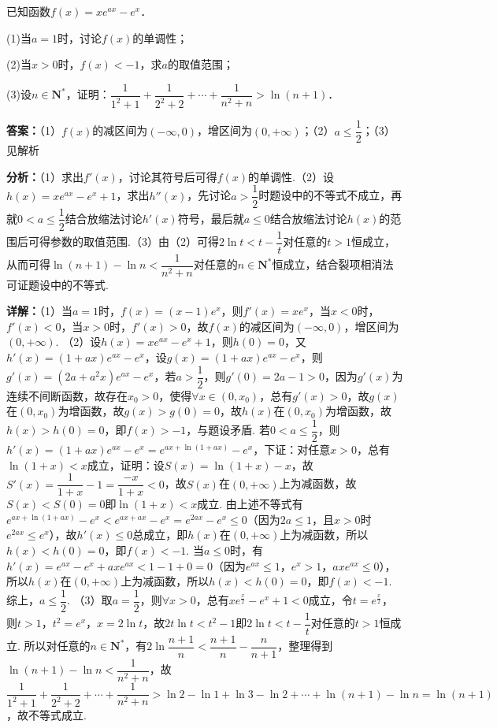 \begin{question}[points=12]
已知函数$f(x)=xe^{ax}-e^x$．

(1)当$a=1$时，讨论$f(x)$的单调性；

(2)当$x>0$时，$f(x)<-1$，求$a$的取值范围；

(3)设$n\in\mathbf{N}^*$，证明：$\dfrac{1}{1^2+1}+\dfrac{1}{2^2+2}+\cdots+\dfrac{1}{n^2+n}>\ln(n+1)$．
\begin{solution}
\textbf{答案：}（1）$f(x)$的减区间为$(-\infty,0)$，增区间为$(0,+\infty)$；（2）$a\leq\dfrac{1}{2}$；（3）见解析

\textbf{分析：}（1）求出$f'(x)$，讨论其符号后可得$f(x)$的单调性.（2）设$h(x)=xe^{ax}-e^x+1$，求出$h''(x)$，先讨论$a>\dfrac{1}{2}$时题设中的不等式不成立，再就$0<a\leq\dfrac{1}{2}$结合放缩法讨论$h'(x)$符号，最后就$a\leq 0$结合放缩法讨论$h(x)$的范围后可得参数的取值范围.（3）由（2）可得$2\ln t<t-\dfrac{1}{t}$对任意的$t>1$恒成立，从而可得$\ln(n+1)-\ln n<\dfrac{1}{n^2+n}$对任意的$n\in\mathbf{N}^*$恒成立，结合裂项相消法可证题设中的不等式.

\textbf{详解：}（1）当$a=1$时，$f(x)=(x-1)e^x$，则$f'(x)=xe^x$，当$x<0$时，$f'(x)<0$，当$x>0$时，$f'(x)>0$，故$f(x)$的减区间为$(-\infty,0)$，增区间为$(0,+\infty)$.
（2）设$h(x)=xe^{ax}-e^x+1$，则$h(0)=0$，又$h'(x)=(1+ax)e^{ax}-e^x$，设$g(x)=(1+ax)e^{ax}-e^x$，则$g'(x)=(2a+a^2x)e^{ax}-e^x$，若$a>\dfrac{1}{2}$，则$g'(0)=2a-1>0$，因为$g'(x)$为连续不间断函数，故存在$x_0>0$，使得$\forall x\in(0,x_0)$，总有$g'(x)>0$，故$g(x)$在$(0,x_0)$为增函数，故$g(x)>g(0)=0$，故$h(x)$在$(0,x_0)$为增函数，故$h(x)>h(0)=0$，即$f(x)>-1$，与题设矛盾. 若$0<a\leq\dfrac{1}{2}$，则$h'(x)=(1+ax)e^{ax}-e^x=e^{ax+\ln(1+ax)}-e^x$，下证：对任意$x>0$，总有$\ln(1+x)<x$成立，证明：设$S(x)=\ln(1+x)-x$，故$S'(x)=\dfrac{1}{1+x}-1=\dfrac{-x}{1+x}<0$，故$S(x)$在$(0,+\infty)$上为减函数，故$S(x)<S(0)=0$即$\ln(1+x)<x$成立. 由上述不等式有$e^{ax+\ln(1+ax)}-e^x<e^{ax+ax}-e^x=e^{2ax}-e^x\leq 0$（因为$2a\leq 1$，且$x>0$时$e^{2ax}\leq e^x$），故$h'(x)\leq 0$总成立，即$h(x)$在$(0,+\infty)$上为减函数，所以$h(x)<h(0)=0$，即$f(x)<-1$. 当$a\leq 0$时，有$h'(x)=e^{ax}-e^x+axe^{ax}<1-1+0=0$（因为$e^{ax}\leq 1$，$e^x>1$，$axe^{ax}\leq 0$），所以$h(x)$在$(0,+\infty)$上为减函数，所以$h(x)<h(0)=0$，即$f(x)<-1$. 综上，$a\leq\dfrac{1}{2}$.
（3）取$a=\dfrac{1}{2}$，则$\forall x>0$，总有$xe^{\frac{x}{2}}-e^x+1<0$成立，令$t=e^{\frac{x}{2}}$，则$t>1$，$t^2=e^x$，$x=2\ln t$，故$2t\ln t<t^2-1$即$2\ln t<t-\dfrac{1}{t}$对任意的$t>1$恒成立. 所以对任意的$n\in\mathbf{N}^*$，有$2\ln\dfrac{n+1}{n}<\dfrac{n+1}{n}-\dfrac{n}{n+1}$，整理得到$\ln(n+1)-\ln n<\dfrac{1}{n^2+n}$，故$\dfrac{1}{1^2+1}+\dfrac{1}{2^2+2}+\cdots+\dfrac{1}{n^2+n}>\ln2-\ln1+\ln3-\ln2+\cdots+\ln(n+1)-\ln n=\ln(n+1)$，故不等式成立.
\end{solution}
\end{question}

